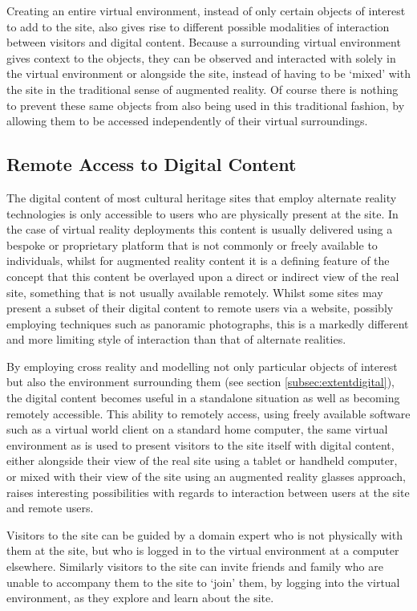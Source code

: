 \documentclass{sig-alternate}
\begin{document}
{Creating an entire virtual environment, instead of only certain objects of interest to add to the site, also gives rise to different possible modalities of interaction between visitors and digital content. Because a surrounding virtual environment gives context to the objects, they can be observed and interacted with solely in the virtual environment or alongside the site, instead of having to be `mixed' with the site in the traditional sense of augmented reality. Of course there is nothing to prevent these same objects from also being used in this traditional fashion, by allowing them to be accessed independently of their virtual surroundings.

\subsection{Remote Access to Digital Content}
\label{subsec:remoteaccess}
The digital content of most cultural heritage sites that employ alternate reality technologies is only accessible to users who are physically present at the site. In the case of virtual reality deployments this content is usually delivered using a bespoke or proprietary platform that is not commonly or freely available to individuals, whilst for augmented reality content it is a defining feature of the concept that this content be overlayed upon a direct or indirect view of the real site, something that is not usually available remotely. Whilst some sites may present a subset of their digital content to remote users via a website, possibly employing techniques such as panoramic photographs, this is a markedly different and more limiting style of interaction than that of alternate realities.

By employing cross reality and modelling not only particular objects of interest but also the environment surrounding them (see section \ref{subsec:extentdigital}), the digital content becomes useful in a standalone situation as well as becoming remotely accessible. This ability to remotely access, using freely available software such as a virtual world client on a standard home computer, the same virtual environment as is used to present visitors to the site itself with digital content, either alongside their view of the real site using a tablet or handheld computer, or mixed with their view of the site using an augmented reality glasses approach, raises interesting possibilities with regards to interaction between users at the site and remote users.

Visitors to the site can be guided by a domain expert who is not physically with them at the site, but who is logged in to the virtual environment at a computer elsewhere. Similarly visitors to the site can invite friends and family who are unable to accompany them to the site to `join' them, by logging into the virtual environment, as they explore and learn about the site.

}
\end{document}
